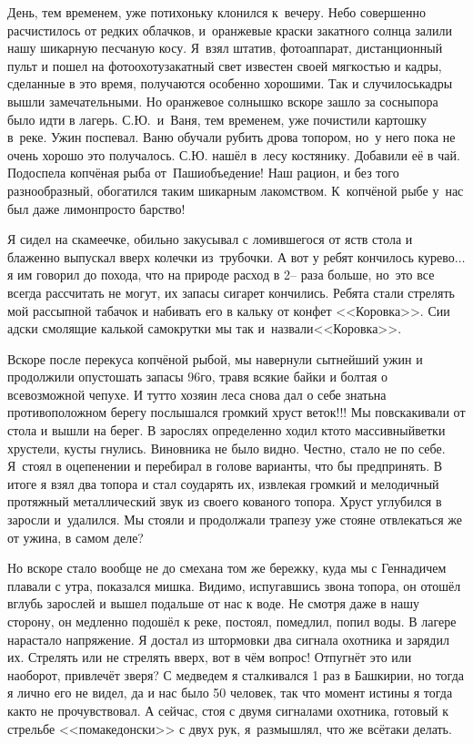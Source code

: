 День, тем временем, уже потихоньку клонился к~вечеру. Небо совершенно расчистилось от редких облачков, и~оранжевые краски закатного солнца залили нашу шикарную песчаную косу. Я~взял штатив, фотоаппарат, дистанционный пульт и пошел на фотоохоту\mdash закатный свет известен своей мягкостью и кадры, сделанные в это время, получаются особенно хорошими. Так и случилось\mdash кадры вышли замечательными. Но оранжевое солнышко вскоре зашло за сосны\mdash пора было идти в лагерь. С.Ю.~и~Ваня, тем временем, уже почистили картошку в~реке. Ужин поспевал. Ваню обучали рубить дрова топором, но~у него пока не очень хорошо это получалось. С.Ю. нашёл в~лесу костянику. Добавили её в чай. Подоспела копчёная рыба от~Паши\mdash объедение! Наш рацион, и без того разнообразный, обогатился таким шикарным лакомством. К~копчёной рыбе у~нас был даже лимон\mdash просто барство! 

Я сидел на скамеечке, обильно закусывал с ломившегося от яств стола и блаженно выпускал вверх колечки из~трубочки. А вот у ребят кончилось курево$\ldots$ я им говорил до похода, что на природе расход в 2\thinspace\nobreakdash-- раза больше, но~это все всегда рассчитать не могут, их запасы сигарет кончились. Ребята стали стрелять мой рассыпной табачок и набивать его в кальку от конфет <<Коровка>>. Сии адски смолящие калькой самокрутки мы так и~назвали\mdash <<Коровка>>. 

Вскоре после перекуса копчёной рыбой, мы навернули сытнейший ужин и продолжили опустошать запасы 96\sdash го, травя всякие байки и болтая о всевозможной чепухе. И тут\sdash то хозяин леса снова дал о себе знать\mdash на противоположном берегу послышался громкий хруст веток!!! Мы повскакивали от стола и вышли на берег. В зарослях определенно ходил кто\sdash то массивный\mdash ветки хрустели, кусты гнулись. Виновника не было видно. Честно, стало не по себе. Я~стоял в оцепенении и перебирал в голове варианты, что бы предпринять. В итоге я взял два топора и стал соударять их, извлекая громкий и мелодичный протяжный металлический звук из своего кованого топора. Хруст углубился в заросли и~удалился. Мы стояли и продолжали трапезу уже стоя\mdash не отвлекаться же от ужина, в самом деле? 

Но вскоре стало вообще не до смеха\mdash на том же бережку, куда мы с Геннадичем плавали с утра, показался мишка. Видимо, испугавшись звона топора, он отошёл вглубь зарослей и вышел подальше от нас к воде. Не смотря даже в нашу сторону, он медленно подошёл к реке, постоял, помедлил, попил воды. В лагере нарастало напряжение. Я достал из штормовки два сигнала охотника и зарядил их. Стрелять или не стрелять вверх, вот в чём вопрос! Отпугнёт это или наоборот, привлечёт зверя? С медведем я сталкивался 1 раз в Башкирии, но тогда я лично его не видел, да и нас было 50 человек, так что момент истины я тогда как\sdash то не прочувствовал. А сейчас, стоя с двумя сигналами охотника, готовый к стрельбе <<по\sdash македонски>> с двух рук, я~размышлял, что же всё\sdash таки делать. 

